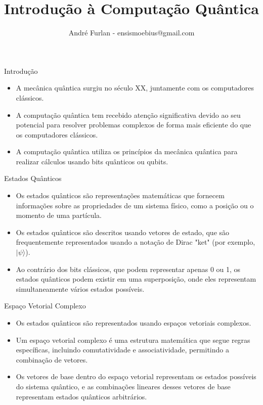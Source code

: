 

\title{Introdução à Computação Quântica}


\author{André Furlan - ensismoebius@gmail.com}

\date{\the\year}


	
	\frame{\titlepage}
	
	\begin{frame}{Introdução}
		\begin{itemize}
			\item A mecânica quântica surgiu no século XX, juntamente com os computadores clássicos.
			\item A computação quântica tem recebido atenção significativa devido ao seu potencial para resolver problemas complexos de forma mais eficiente do que os computadores clássicos.
			\item A computação quântica utiliza os princípios da mecânica quântica para realizar cálculos usando bits quânticos ou qubits.
		\end{itemize}
	\end{frame}
	
	\begin{frame}{Estados Quânticos}
		\begin{itemize}
			\item Os estados quânticos são representações matemáticas que fornecem informações sobre as propriedades de um sistema físico, como a posição ou o momento de uma partícula.
			\item Os estados quânticos são descritos usando vetores de estado, que são frequentemente representados usando a notação de Dirac "ket" (por exemplo, $|\psi\rangle$).
			\item Ao contrário dos bits clássicos, que podem representar apenas 0 ou 1, os estados quânticos podem existir em uma superposição, onde eles representam simultaneamente vários estados possíveis.
		\end{itemize}
	\end{frame}
	
	\begin{frame}{Espaço Vetorial Complexo}
		\begin{itemize}
			\item Os estados quânticos são representados usando espaços vetoriais complexos.
			\item Um espaço vetorial complexo é uma estrutura matemática que segue regras específicas, incluindo comutatividade e associatividade, permitindo a combinação de vetores.
			\item Os vetores de base dentro do espaço vetorial representam os estados possíveis do sistema quântico, e as combinações lineares desses vetores de base representam estados quânticos arbitrários.
		\end{itemize}
	\end{frame}
	
